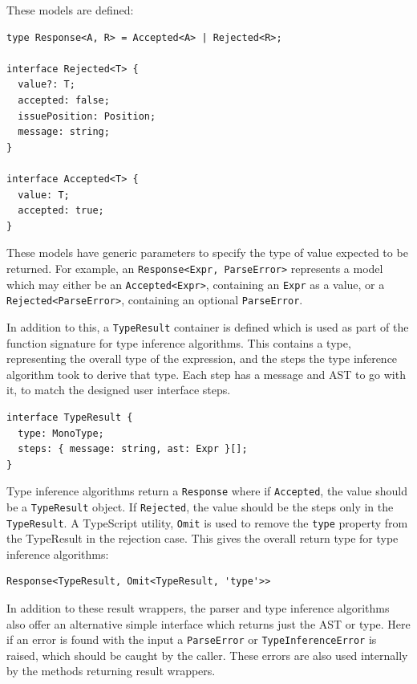\documentclass[a4paper,fleqn,oneside,12pt]{report}
\begin{document}
These models are defined:

\begin{verbatim}
type Response<A, R> = Accepted<A> | Rejected<R>;

interface Rejected<T> {
  value?: T;
  accepted: false;
  issuePosition: Position;
  message: string;
}

interface Accepted<T> {
  value: T;
  accepted: true;
}
\end{verbatim}

These models have generic parameters to specify the type of value expected to be returned. For example, an \texttt{Response<Expr, ParseError>} represents a model which may either be an \texttt{Accepted<Expr>}, containing an \texttt{Expr} as a value, or a \texttt{Rejected<ParseError>}, containing an optional \texttt{ParseError}.

In addition to this, a \texttt{TypeResult} container is defined which is used as part of the function signature for type inference algorithms. This contains a type, representing the overall type of the expression, and the steps the type inference algorithm took to derive that type. Each step has a message and AST to go with it, to match the designed user interface steps.

\begin{verbatim}
interface TypeResult {
  type: MonoType;
  steps: { message: string, ast: Expr }[];
}
\end{verbatim}

Type inference algorithms return a \texttt{Response} where if \texttt{Accepted}, the value should be a \texttt{TypeResult} object. If \texttt{Rejected}, the value should be the steps only in the \texttt{TypeResult}. A TypeScript utility, \texttt{Omit} is used to remove the \texttt{type} property from the TypeResult in the rejection case. This gives the overall return type for type inference algorithms:

\begin{verbatim}
Response<TypeResult, Omit<TypeResult, 'type'>>
\end{verbatim}
In addition to these result wrappers, the parser and type inference algorithms also offer an alternative simple interface which returns just the AST or type. Here if an error is found with the input a \texttt{ParseError} or \texttt{TypeInferenceError} is raised, which should be caught by the caller. These errors are also used internally by the methods returning result wrappers.
\end{document}
